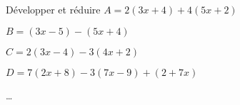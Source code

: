 \begin{exercice*}
    Développer et réduire
$A=2(3x+4)+4(5x+2)$\par
$B=(3x-5)-(5x+4)$\par
$C=2(3x-4)-3(4x+2)$\par
$D=7(2x+8)-3(7x-9)+(2+7x)$ \par

\end{exercice*}
\begin{corrige}
    \dots
\end{corrige}

